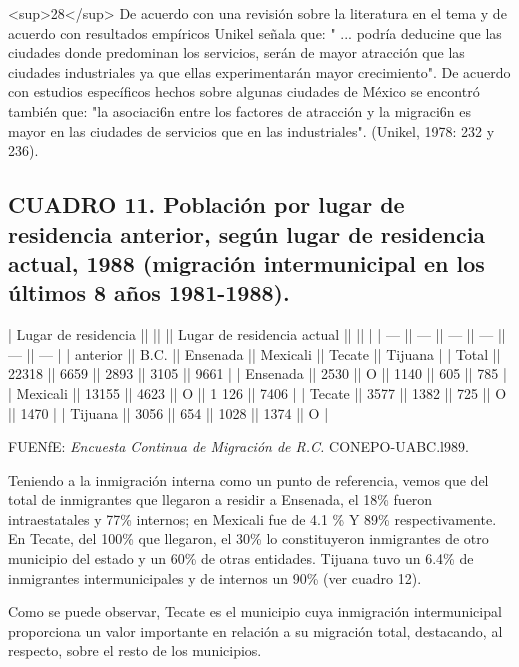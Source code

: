 \documentclass{article}
\begin{document}
<sup>28</sup> De acuerdo con una revisión sobre la literatura en el tema y de acuerdo con resultados empíricos Unikel señala que: " ... podría deducine que las ciudades donde predominan los servicios, serán de mayor atracción que las ciudades industriales ya que ellas experimentarán mayor crecimiento". De acuerdo con estudios específicos hechos sobre algunas ciudades de México se encontró también que: "la asociaci6n entre los factores de atracción y la migraci6n es mayor en las ciudades de servicios que en las industriales". (Unikel, 1978: 232 y 236).

\subsection{CUADRO 11. Población por lugar de residencia anterior, según lugar de residencia actual, 1988 (migración intermunicipal en los últimos 8 años 1981-1988).}

| Lugar de residencia ||       ||          || Lugar de residencia actual ||        ||         |
| ---                 || ---   || ---      || ---                        || ---    || ---     |
| anterior            || B.C.  || Ensenada || Mexicali                   || Tecate || Tijuana |
| Total               || 22318 || 6659     || 2893                       || 3105   || 9661    |
| Ensenada            || 2530  || O        || 1140                       || 605    || 785     |
| Mexicali            || 13155 || 4623     || O                          || 1 126  || 7406    |
| Tecate              || 3577  || 1382     || 725                        || O      || 1470    |
| Tijuana             || 3056  || 654      || 1028                       || 1374   || O       |

FUENfE: \textit{Encuesta Continua de Migración de R.C.} CONEPO-UABC.l989.

Teniendo a la inmigración interna como un punto de referencia, vemos que del total de inmigrantes que llegaron a residir a Ensenada, el 18\% fueron intraestatales y 77\% internos; en Mexicali fue de 4.1 \% Y 89\% respectivamente. En Tecate, del 100\% que llegaron, el 30\% lo constituyeron inmigrantes de otro municipio del estado y un 60\% de otras entidades. Tijuana tuvo un 6.4\% de inmigrantes intermunicipales y de internos un 90\% (ver cuadro 12).

Como se puede observar, Tecate es el municipio cuya inmigración intermunicipal proporciona un valor importante en relación a su migración total, destacando, al respecto, sobre el resto de los municipios.
\end{document}
